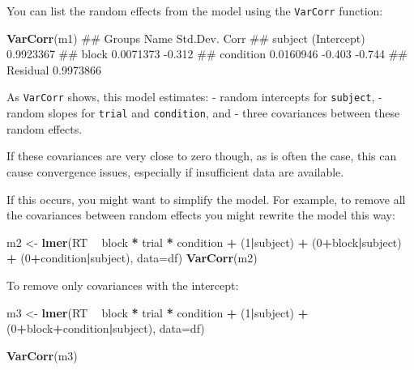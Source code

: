 \documentclass[]{article}
\newenvironment{Shaded}{\begin{snugshade}}{\end{snugshade}}
\newcommand{\KeywordTok}[1]{\textcolor[rgb]{0.13,0.29,0.53}{\textbf{#1}}}
\newcommand{\DataTypeTok}[1]{\textcolor[rgb]{0.13,0.29,0.53}{#1}}
\newcommand{\DecValTok}[1]{\textcolor[rgb]{0.00,0.00,0.81}{#1}}
\newcommand{\StringTok}[1]{\textcolor[rgb]{0.31,0.60,0.02}{#1}}
\newcommand{\OperatorTok}[1]{\textcolor[rgb]{0.81,0.36,0.00}{\textbf{#1}}}
\newcommand{\NormalTok}[1]{#1}
\theoremstyle{definition}
\theoremstyle{definition}
\theoremstyle{definition}
\theoremstyle{remark}
\begin{document}
You can list the random effects from the model using the
\texttt{VarCorr} function:

\begin{Shaded}
\begin{Highlighting}[]
\KeywordTok{VarCorr}\NormalTok{(m1)}
\NormalTok{##  Groups   Name        Std.Dev.  Corr         }
\NormalTok{##  subject  (Intercept) 0.9923367              }
\NormalTok{##           block       0.0071373 -0.312       }
\NormalTok{##           condition   0.0160946 -0.403 -0.744}
\NormalTok{##  Residual             0.9973866}
\end{Highlighting}
\end{Shaded}

As \texttt{VarCorr} shows, this model estimates: - random intercepts for
\texttt{subject}, - random slopes for \texttt{trial} and
\texttt{condition}, and - three covariances between these random
effects.

If these covariances are very close to zero though, as is often the
case, this can cause convergence issues, especially if insufficient data
are available.

If this occurs, you might want to simplify the model. For example, to
remove all the covariances between random effects you might rewrite the
model this way:

\begin{Shaded}
\begin{Highlighting}[]
\NormalTok{m2 <-}\StringTok{ }\KeywordTok{lmer}\NormalTok{(RT }\OperatorTok{~}\StringTok{ }\NormalTok{block }\OperatorTok{*}\StringTok{ }\NormalTok{trial }\OperatorTok{*}\StringTok{ }\NormalTok{condition }\OperatorTok{+}\StringTok{ }
\StringTok{  }\NormalTok{(}\DecValTok{1}\OperatorTok{|}\NormalTok{subject) }\OperatorTok{+}
\StringTok{  }\NormalTok{(}\DecValTok{0}\OperatorTok{+}\NormalTok{block}\OperatorTok{|}\NormalTok{subject) }\OperatorTok{+}\StringTok{ }
\StringTok{  }\NormalTok{(}\DecValTok{0}\OperatorTok{+}\NormalTok{condition}\OperatorTok{|}\NormalTok{subject), }\DataTypeTok{data=}\NormalTok{df)}
\KeywordTok{VarCorr}\NormalTok{(m2)}
\end{Highlighting}
\end{Shaded}

To remove only covariances with the intercept:

\begin{Shaded}
\begin{Highlighting}[]
\NormalTok{m3 <-}\StringTok{ }\KeywordTok{lmer}\NormalTok{(RT }\OperatorTok{~}\StringTok{ }\NormalTok{block }\OperatorTok{*}\StringTok{ }\NormalTok{trial }\OperatorTok{*}\StringTok{ }\NormalTok{condition }\OperatorTok{+}\StringTok{ }
\StringTok{  }\NormalTok{(}\DecValTok{1}\OperatorTok{|}\NormalTok{subject) }\OperatorTok{+}\StringTok{ }
\StringTok{  }\NormalTok{(}\DecValTok{0}\OperatorTok{+}\NormalTok{block}\OperatorTok{+}\NormalTok{condition}\OperatorTok{|}\NormalTok{subject), }\DataTypeTok{data=}\NormalTok{df)}

\KeywordTok{VarCorr}\NormalTok{(m3)}
\end{Highlighting}
\end{Shaded}
\end{document}
